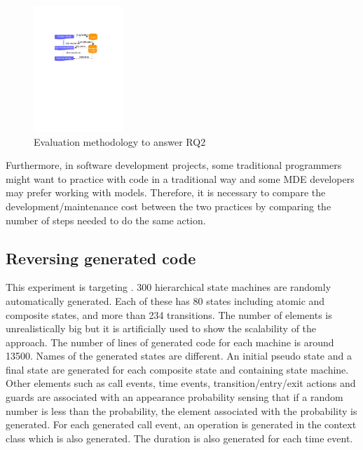 \begin{figure}
\centering
\includegraphics[clip, trim=4.5cm 16.5cm 5.5cm 6.5cm, width=0.3\textwidth]{figures/strategy2}
\caption{Evaluation methodology to answer RQ2} 
\label{fig:strategy2}
\end{figure}

Furthermore, in software development projects, some traditional programmers might want to practice with code in a traditional way and some MDE developers may prefer working with models. Therefore, it is necessary to compare the development/maintenance cost between the two practices by comparing the number of steps needed to do the same action. 


\subsection{Reversing generated code}
This experiment is targeting . 300 hierarchical state machines are randomly automatically generated. Each of these has 80 states including atomic and composite states, and more than 234 transitions. The number of elements is unrealistically big but it is artificially used to show the scalability of the approach. The number of lines of generated code for each machine is around 13500. Names of the generated states are different. An initial pseudo state and a final state are generated for each composite state and containing state machine. Other elements such as call events, time events, transition/entry/exit actions and guards are associated with an appearance probability sensing that if a random number is less than the probability, the element associated with the probability is generated. For each generated call event, an operation is generated in the context class which is also generated. The duration is also generated for each time event. 


